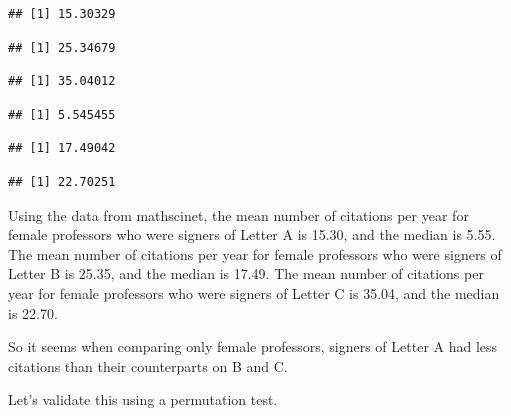 \documentclass[]{article}
\begin{document}
\begin{verbatim}
## [1] 15.30329
\end{verbatim}

\begin{verbatim}
## [1] 25.34679
\end{verbatim}

\begin{verbatim}
## [1] 35.04012
\end{verbatim}

\begin{verbatim}
## [1] 5.545455
\end{verbatim}

\begin{verbatim}
## [1] 17.49042
\end{verbatim}

\begin{verbatim}
## [1] 22.70251
\end{verbatim}

Using the data from mathscinet, the mean number of citations per year
for female professors who were signers of Letter A is 15.30, and the
median is 5.55. The mean number of citations per year for female
professors who were signers of Letter B is 25.35, and the median is
17.49. The mean number of citations per year for female professors who
were signers of Letter C is 35.04, and the median is 22.70.

So it seems when comparing only female professors, signers of Letter A
had less citations than their counterparts on B and C.

Let's validate this using a permutation test.
\end{document}
